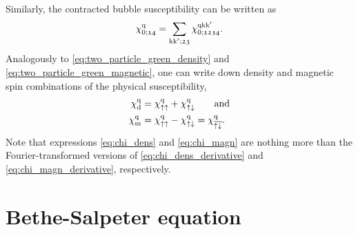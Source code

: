 \documentclass[\main/main.tex]{subfiles}
\begin{document}
Similarly, the contracted bubble susceptibility can be written as
\begin{align}
	\chi_{0;\mathfrak{14}}^{\text{q}}=\sum_{\text{k}\text{k}';\mathfrak{23}}\chi_{0;\mathfrak{1234}}^{\text{q}\text{k}\text{k}'}.
\end{align}
Analogously to \eqref{eq:two_particle_green_density} and \eqref{eq:two_particle_green_magnetic}, one can write down density and magnetic spin combinations of the physical susceptibility,
\begin{subequations}
\begin{align}
	\chi_{\text{d}}^{\text{q}}&=\chi_{\uparrow\uparrow}^{\text{q}}+\chi_{\uparrow\downarrow}^{\text{q}}\qquad\text{and}\label{eq:chi_dens}\\
	\chi_{\text{m}}^{\text{q}}&=\chi_{\uparrow\uparrow}^{\text{q}}-\chi_{\uparrow\downarrow}^{\text{q}}=\chi_{\overline{\uparrow\downarrow}}^{\text{q}}.\label{eq:chi_magn}
\end{align}
\end{subequations}
Note that expressions \eqref{eq:chi_dens} and \eqref{eq:chi_magn} are nothing more than the Fourier-transformed versions of \eqref{eq:chi_dens_derivative} and \eqref{eq:chi_magn_derivative}, respectively.

\section{Bethe-Salpeter equation}\label{sec:bethe_salpeter}
\end{document}
